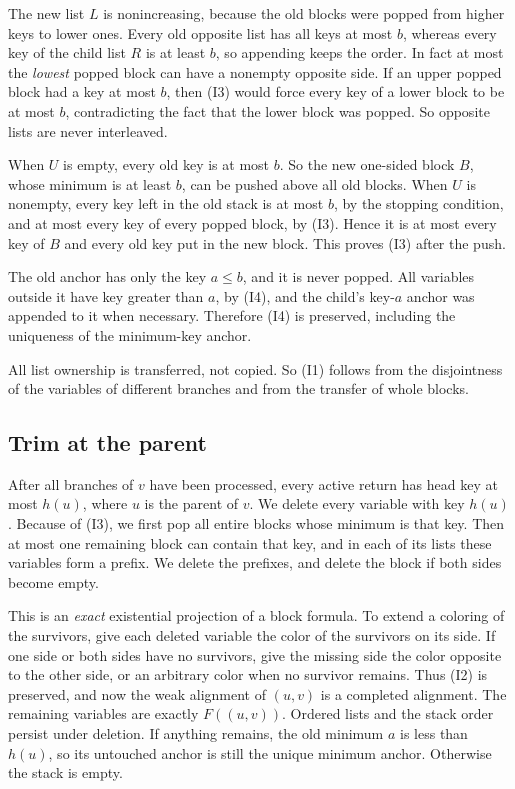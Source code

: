\documentclass[11pt]{article}
\begin{document}
The new list $L$ is nonincreasing, because the old blocks were popped from
higher keys to lower ones. Every old opposite list has all keys at most $b$,
whereas every key of the child list $R$ is at least $b$, so appending keeps the
order. In fact at most the \emph{lowest} popped block can have a nonempty
opposite side. If an upper popped block had a key at most $b$, then (I3) would
force every key of a lower block to be at most $b$, contradicting the fact that
the lower block was popped. So opposite lists are never interleaved.

When $U$ is empty, every old key is at most $b$. So the new one-sided block
$B$, whose minimum is at least $b$, can be pushed above all old blocks. When
$U$ is nonempty, every key left in the old stack is at most $b$, by the
stopping condition, and at most every key of every popped block, by (I3). Hence
it is at most every key of $B$ and every old key put in the new block. This
proves (I3) after the push.

The old anchor has only the key $a\le b$, and it is never popped. All variables
outside it have key greater than $a$, by (I4), and the child's key-$a$ anchor
was appended to it when necessary. Therefore (I4) is preserved, including the
uniqueness of the minimum-key anchor.

All list ownership is transferred, not copied. So (I1) follows from the
disjointness of the variables of different branches and from the transfer of
whole blocks.

\subsection*{Trim at the parent}

After all branches of $v$ have been processed, every active return has head key
at most $h(u)$, where $u$ is the parent of $v$. We delete every variable with
key $h(u)$. Because of (I3), we first pop all entire blocks whose minimum is
that key. Then at most one remaining block can contain that key, and in each of
its lists these variables form a prefix. We delete the prefixes, and delete the
block if both sides become empty.

This is an \emph{exact} existential projection of a block formula. To extend a
coloring of the survivors, give each deleted variable the color of the
survivors on its side. If one side or both sides have no survivors, give the
missing side the color opposite to the other side, or an arbitrary color when
no survivor remains. Thus (I2) is preserved, and now the weak alignment of
$(u,v)$ is a completed alignment. The remaining variables are exactly
$F((u,v))$. Ordered lists and the stack order persist under deletion. If
anything remains, the old minimum $a$ is less than $h(u)$, so its untouched
anchor is still the unique minimum anchor. Otherwise the stack is empty.
\end{document}
